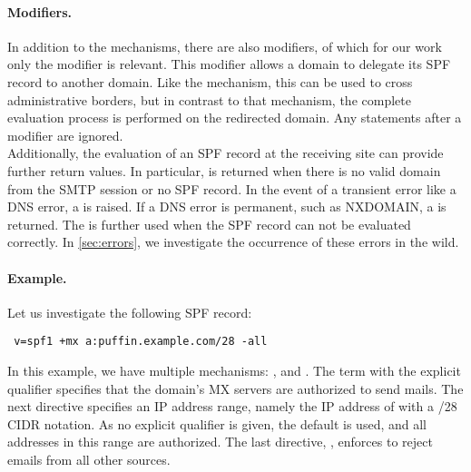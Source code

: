 \paragraph{Modifiers.}
In addition to the mechanisms, there are also modifiers, of which for our work only the  modifier is relevant. 
This modifier allows a domain to delegate its SPF record to another domain.
Like the  mechanism, this can be used to cross administrative borders, but in contrast to that mechanism, the complete evaluation process is performed on the redirected domain. Any statements after a  modifier are ignored. \\

Additionally, the evaluation of an SPF record at the receiving site can provide further return values.
In particular,  is returned when there is no valid domain from the SMTP session or no SPF record.
In the event of a transient error like a DNS error, a  is raised.
If a DNS error is permanent, such as NXDOMAIN, a  is returned.
The  is further used when the SPF record can not be evaluated correctly.
In \autoref{sec:errors}, we investigate the occurrence of these errors in the wild.

\paragraph{Example.}
Let us investigate the following SPF record:
\begin{center}
\color{cbone}
\begin{verbatim}
 v=spf1 +mx a:puffin.example.com/28 -all
\end{verbatim}
\end{center}
In this example, we have multiple mechanisms: ,  and .
The term  with the explicit  qualifier specifies that the domain's MX servers are authorized to send mails.
The next directive specifies an IP address range, namely the IP address of  with a /28 CIDR notation.
As no explicit qualifier is given, the default  is used, and all addresses in this range are authorized.
The last directive, , enforces to reject emails from all other sources.





